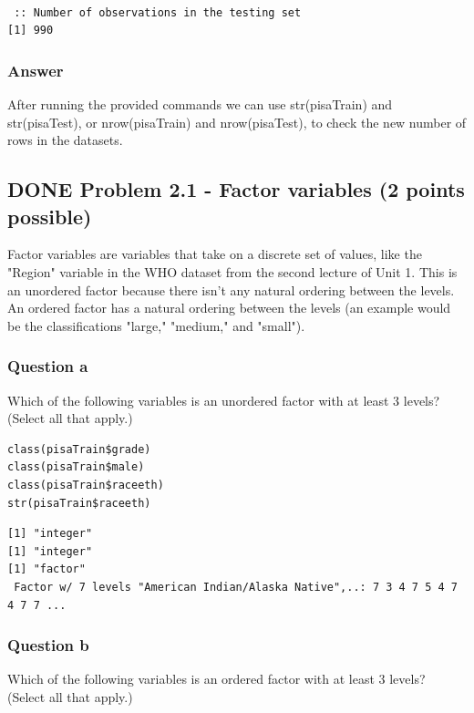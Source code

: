 \documentclass[letterpaper, 9pt, onecolumn, twoside, technote, final]{IEEEtran}
\begin{document}
\begin{verbatim}

 :: Number of observations in the testing set
[1] 990
\end{verbatim}

\subsubsection{Answer}
\label{sec-2-4-3}

After running the provided commands we can use str(pisaTrain) and
str(pisaTest), or nrow(pisaTrain) and nrow(pisaTest), to check the new
number of rows in the datasets.

\subsection{{\bfseries\sffamily DONE} Problem 2.1 - Factor variables (2 points possible)}
\label{sec-2-5}
Factor variables are variables that take on a discrete set of values,
like the "Region" variable in the WHO dataset from the second lecture
of Unit 1. This is an unordered factor because there isn't any natural
ordering between the levels. An ordered factor has a natural ordering
between the levels (an example would be the classifications "large,"
"medium," and "small").

\subsubsection{Question a}
\label{sec-2-5-1}

Which of the following variables is an unordered factor with at least
3 levels? (Select all that apply.)

\begin{verbatim}
class(pisaTrain$grade)
class(pisaTrain$male)
class(pisaTrain$raceeth)
str(pisaTrain$raceeth)
\end{verbatim}

\begin{verbatim}
[1] "integer"
[1] "integer"
[1] "factor"
 Factor w/ 7 levels "American Indian/Alaska Native",..: 7 3 4 7 5 4 7 4 7 7 ...
\end{verbatim}

\subsubsection{Question b}
\label{sec-2-5-2}

Which of the following variables is an ordered factor with at least 3
levels? (Select all that apply.)
\end{document}
